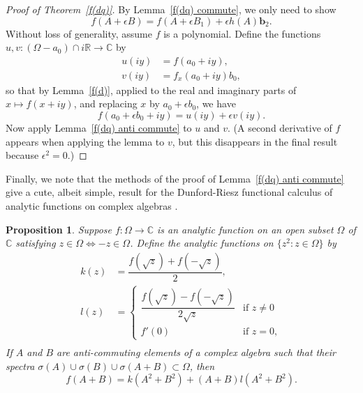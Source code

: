 \documentclass[12pt,reqno]{amsart}
\newtheorem{prop}[theorem]{Proposition}
\begin{document}
\begin{proof}[Proof of Theorem~\ref{f(dq)}]
By Lemma~\ref{f(dq) commute}, we only need to show
\begin{equation}
f(A+\epsilon B) = f(A + \epsilon B_1) + \epsilon h(A) \bm b_2 .
\end{equation}
Without loss of generality, assume $f$ is a polynomial.  Define the functions $u,v:(\Omega-a_0) \cap i\mathbb R \to \mathbb C$ by
\begin{align}
u(iy) &= f(a_0 + iy) , \\
v(iy) &= f_{x}(a_0 + iy) b_0,
\end{align}
so that by Lemma~\ref{f(d)}, applied to the real and imaginary parts of $x \mapsto f(x + iy)$, and replacing $x$ by $a_0 + \epsilon b_0$, we have
\begin{equation}
f(a_0 + \epsilon b_0 + i y) = u(iy) + \epsilon v(iy) .
\end{equation}
Now apply Lemma~\ref{f(dq) anti commute} to $u$ and $v$.  (A second derivative of $f$ appears when applying the lemma to $v$, but this disappears in the final result because $\epsilon^2 = 0$.)
\end{proof}

Finally, we note that the methods of the proof of Lemma~\ref{f(dq) anti commute} give a cute, albeit simple, result for the Dunford-Riesz functional calculus of analytic functions on complex algebras \cite{dunford-et-al}.

\begin{prop}
\label{analytic}
Suppose $f:\Omega \to \mathbb C$ is an analytic function on an open subset $\Omega$ of $\mathbb C$ satisfying $z \in \Omega \Leftrightarrow -z \in \Omega$.  Define the analytic functions on $\{z^2 : z \in \Omega\}$ by
\begin{align}
\label{g a}
k(z) &= \dfrac{f(\sqrt z) + f(-\sqrt z)}{2} ,\\
\label{h a}
l(z) &= \begin{cases}
\dfrac{f(\sqrt z) - f(-\sqrt z)}{2\sqrt z} &\text{if $z \ne 0$} \\
f'(0) &\text{if $z = 0$} ,
\end{cases} \\
\end{align}
If $A$ and $B$ are anti-commuting elements of a complex algebra such that their spectra $\sigma(A) \cup \sigma(B) \cup \sigma(A+B) \subset \Omega$, then
\begin{equation}
f(A+B) = k(A^2+B^2) + (A+B) l(A^2+B^2) .
\end{equation}
\end{prop}
\end{document}
